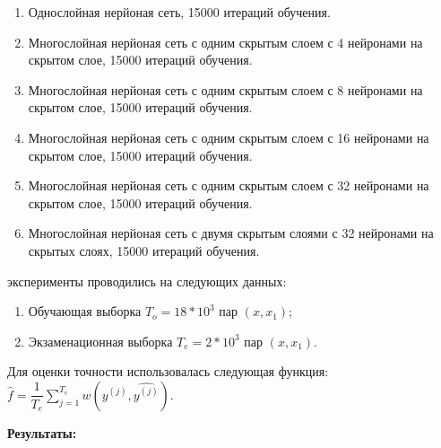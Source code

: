 \documentclass[a4paper,12pt,twoside]{article}
\begin{document}
	\begin{enumerate}
		\item Однослойная нерйоная сеть, 15000 итераций обучения.
		
		\item Многослойная нерйоная сеть с одним скрытым слоем с 4 нейронами на скрытом слое, 15000 итераций обучения.
		\item Многослойная нерйоная сеть с одним скрытым слоем с 8 нейронами на скрытом слое, 15000 итераций обучения.
		\item Многослойная нерйоная сеть с одним скрытым слоем с 16 нейронами на скрытом слое, 15000 итераций обучения.
		\item Многослойная нерйоная сеть с одним скрытым слоем с 32 нейронами на скрытом слое, 15000 итераций обучения.
		\item Многослойная нерйоная сеть с двумя скрытым слоями с 32 нейронами на скрытых слоях, 15000 итераций обучения.
	\end{enumerate}
	
	\bigskip
	 эксперименты проводились на следующих данных:
	\begin{enumerate}
		\item Обучающая выборка $T_o=18 * 10^3$ пар $(x, x_1)$;
		\item Экзаменационная выборка $T_e=2 * 10^3$ пар $(x, x_1)$.
	\end{enumerate}
	
	\bigskip
	\noindent
	Для оценки точности использовалась следующая функция:
	$\hat{f} = \dfrac{1}{T_e}\sum_{j=1}^{T_e}w(y^{(j)}, \hat{y^{(j)}})$.
	
	\bigskip
	
	\noindent\textbf{Результаты:}
	
	\bigskip	
	
\end{document}
